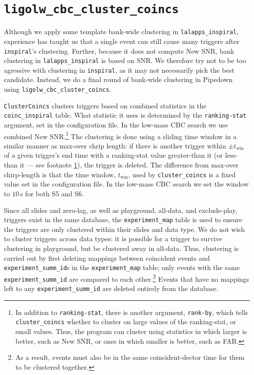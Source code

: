 \section{\texttt{ligolw\_cbc\_cluster\_coincs}}

Although we apply some template bank-wide clustering in \verb|lalapps_inspiral|,
experience has taught us that a single event can still cause many triggers
after \verb|inspiral|'s clustering. Further, because it does not compute New
\ac{SNR}, bank clustering in \verb|lalapps_inspiral| is based on \ac{SNR}. We
therefore try not to be too agressive with clustering in \verb|inspiral|, as it
may not necessarily pick the best candidate. Instead, we do a final round of
bank-wide clustering in Pipedown using \verb|ligolw_cbc_cluster_coincs|.

\verb|ClusterCoincs| clusters triggers based on combined statistics in the
\verb|coinc_inspiral| table. What statistic it uses is determined by the
\verb|ranking-stat| argument, set in the configuration file. In the low-mass
\ac{CBC} search we use combined New \ac{SNR}.\footnote{\label{ftnt:ranking_by}
In addition to \texttt{ranking-stat}, there is another argument,
\texttt{rank-by}, which tells \texttt{cluster\_coincs} whether to cluster on
large values of the ranking-stat, or small values. Thus, the program can
cluster using statistics in which larger is better, such as New \ac{SNR}, or
ones in which smaller is better, such as \ac{FAR}.} The clustering is done
using a sliding time window in a similar manner as max-over chrip length: if
there is another trigger within $\pm t_{\mathrm{win}}$ of a given trigger's end
time with a ranking-stat value greater-than it (or less-than it --- see
footnote \ref{ftnt:ranking_by}), the trigger is deleted. The difference from
max-over chirp-length is that the time window, $t_{\mathrm{win}}$, used by
\verb|cluster_coincs| is a fixed value set in the configuration file. In the
low-mass \ac{CBC} search we set the window to $10\,$s for both \ac{S5} and
\ac{S6}.

Since all slides and zero-lag, as well as playground, all-data, and
exclude-play, triggers exist in the same database, the \verb|experiment_map|
table is used to ensure the triggers are only clustered within their slides and
data type. We do not wish to cluster triggers across data types: it is possible
for a trigger to survive clustering in playground, but be clustered away in
all-data. Thus, clustering is carried out by first deleting mappings between
coincident events and \verb|experiment_summ_id|s in the \verb|experiment_map|
table; only events with the same \verb|experiment_summ_id| are compared to each
other.\footnote{As a result, events must also be in the same coincident-dector
time for them to be clustered together.} Events that have no mappings left to
any \verb|experiment_summ_id| are deleted entirely from the database.

